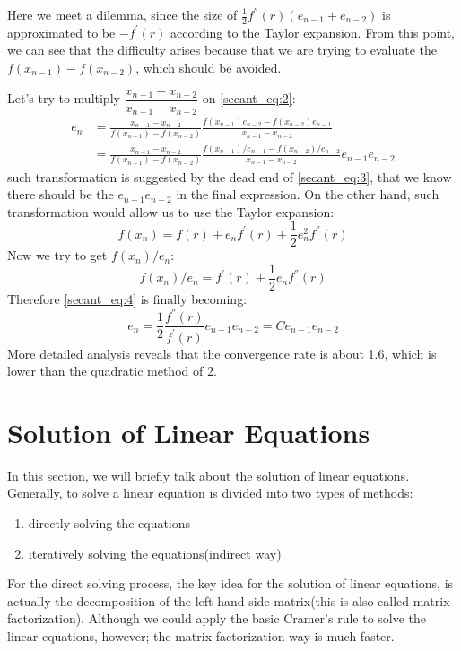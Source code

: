 Here we meet a dilemma, since the size of $\frac{1}{2}f^{''}(r)(e_{n-1}+e_{n-2})$ is 
approximated to be $-f^{'}(r)$ according to the Taylor expansion.
From this point, we can see that the difficulty arises because that we are trying to 
evaluate the $f(x_{n-1})-f(x_{n-2})$, which should be avoided. 

Let's try to multiply $\dfrac{x_{n-1} - x_{n-2}}{x_{n-1} - x_{n-2}}$ on \ref{secant_eq:2}:
\begin{align}
\label{secant_eq:4}
 e_{n}  &= \frac{x_{n-1} - x_{n-2}}{f(x_{n-1})-f(x_{n-2})}
\frac{f(x_{n-1})e_{n-2} - f(x_{n-2})e_{n-1}}{x_{n-1} - x_{n-2}} \nonumber \\
&= \frac{x_{n-1} - x_{n-2}}{f(x_{n-1})-f(x_{n-2})}
\frac{f(x_{n-1})/e_{n-1} - f(x_{n-2})/e_{n-2}}{x_{n-1} - x_{n-2}}e_{n-1}e_{n-2}
\end{align}
such transformation is suggested by the dead end of \ref{secant_eq:3}, that we know there should
be the $e_{n-1}e_{n-2}$ in the final expression. On the other hand, such transformation would 
allow us to use the Taylor expansion:
\begin{equation}
 f(x_{n}) = f(r) + e_{n}f^{'}(r) + \frac{1}{2}e^{2}_{n}f^{''}(r)
\end{equation}
Now we try to get $f(x_{n})/e_{n}$:
\begin{equation}
 f(x_{n})/e_{n} = f^{'}(r) + \frac{1}{2}e_{n}f^{''}(r) 
\end{equation}
Therefore \ref{secant_eq:4} is finally becoming:
\begin{equation}
 e_{n}  = \frac{1}{2}\frac{f^{''}(r)}{f^{'}(r)}e_{n-1}e_{n-2} = Ce_{n-1}e_{n-2}
\end{equation}
More detailed analysis reveals that the convergence rate is about 1.6, which is 
lower than the quadratic method of 2.

\section{Solution of Linear Equations}
%
%
%
In this section, we will briefly talk about the solution of linear equations.
Generally, to solve a linear equation is divided into two types of methods:
\begin{enumerate}
 \item directly solving the equations
 \item iteratively solving the equations(indirect way)
\end{enumerate}

For the direct solving process, the key idea for the solution of linear equations, 
is actually the decomposition of the left hand side matrix(this is also called 
matrix factorization). Although we could apply the basic Cramer's rule to solve 
the linear equations, however; the matrix factorization way is much faster.

